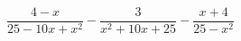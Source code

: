 \begin{ex}[type=expression]
	\begin{condition}
		\(\dfrac{4-x}{25-10x+x^2}-\dfrac{3}{x^2+10x+25}-\dfrac{x+4}{25-x^2}\)
	\end{condition}
\end{ex}